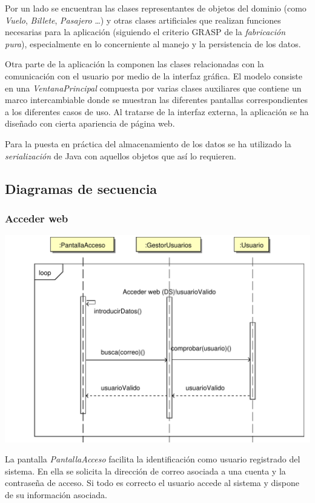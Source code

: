 \documentclass[11pt, a4paper, twoside, titlepage]{article}
\begin{document}
			Por un lado se encuentran las clases representantes de objetos del dominio (como \textit{Vuelo}, \textit{Billete}, \textit{Pasajero} \ldots) y otras clases artificiales que realizan funciones necesarias para la aplicación (siguiendo el criterio GRASP de la \textit{fabricación pura}), especialmente en lo concerniente al manejo y la persistencia de los datos.

			Otra parte de la aplicación la componen las clases relacionadas con la comunicación con el usuario por medio de la interfaz gráfica. El modelo consiste en una \textit{VentanaPrincipal} compuesta por varias clases auxiliares que contiene un marco intercambiable donde se muestran las diferentes pantallas correspondientes a los diferentes casos de uso. Al tratarse de la interfaz externa, la aplicación se ha diseñado con cierta apariencia de página web.

			Para la puesta en práctica del almacenamiento de los datos se ha utilizado la \textit{serialización} de Java con aquellos objetos que así lo requieren.

		\subsection{Diagramas de secuencia}
			\subsubsection{Acceder web}
				\begin{center}
					\includegraphics[scale=.7]{diseno/diagramas/accederweb.pdf}
				\end{center}
				La pantalla {\itshape PantallaAcceso} facilita la identificación como usuario registrado del sistema.
				En ella se solicita la dirección de correo asociada a una cuenta y la contraseña de acceso. Si todo es correcto el usuario accede al sistema y dispone de su información asociada.
\end{document}
